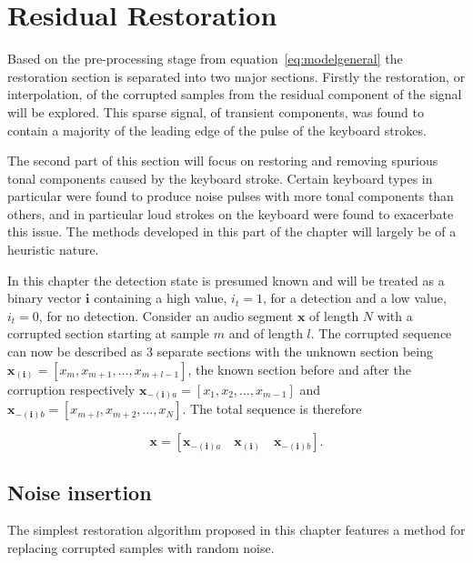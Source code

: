 \section{Residual Restoration}
Based on the pre-processing stage from equation~\ref{eq:modelgeneral} the restoration section is separated into two major sections. Firstly the restoration, or interpolation, of the corrupted samples from the residual component of the signal will be explored. This sparse signal, of transient components, was found to contain a majority of the leading edge of the pulse of the keyboard strokes.

The second part of this section will focus on restoring and removing spurious tonal components caused by the keyboard stroke. Certain keyboard types in particular were found to produce noise pulses with more tonal components than others, and in particular loud strokes on the keyboard were found to exacerbate this issue. The methods developed in this part of the chapter will largely be of a heuristic nature.

In this chapter the detection state is presumed known and will be treated as a binary vector $\boldsymbol{i}$ containing a high value, $i_t = 1$, for a detection and a low value, $i_t = 0$, for no detection. Consider an audio segment $\boldsymbol{x}$ of length $N$ with a corrupted section starting at sample $m$ and of length $l$. The corrupted sequence can now be described as 3 separate sections with the unknown section being $\boldsymbol{x_{(i)}} = [x_m,x_{m+1},\ldots,x_{m+l-1}]$, the known section before and after the corruption respectively $\boldsymbol{x}_{\boldsymbol{-(i)}a} = [x_1,x_{2},\ldots,x_{m-1}]$ and $\boldsymbol{x}_{\boldsymbol{-(i)}b} = [x_{m+l},x_{m+2},\ldots,x_{N}]$. The total sequence is therefore

\begin{equation}\label{eq:RestBasicModel}
\boldsymbol{x} = \left[ \boldsymbol{x}_{\boldsymbol{-(i)}a}\quad\boldsymbol{x_{(i)}}\quad\boldsymbol{x}_{\boldsymbol{-(i)}b} \right].
\end{equation}


\subsection{Noise insertion}
The simplest restoration algorithm proposed in this chapter features a method for replacing corrupted samples with random noise.

